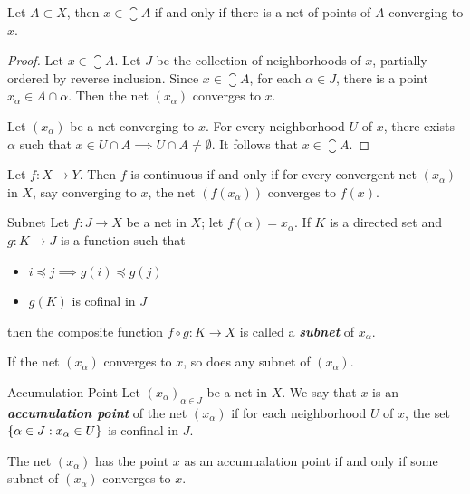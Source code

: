\documentclass[12pt,a4paper]{article}
\begin{document}
    \begin{thm}
        Let $A\subset X$, then $x\in\closure{A}$ if and only if there is a net of points of $A$ converging to $x$.
    \end{thm}
    \begin{proof}
        Let $x\in\closure{A}$. Let $J$ be the collection of neighborhoods of $x$, partially ordered by reverse inclusion. Since $x\in \closure{A}$, for each $\alpha\in J$, there is a point $x_\alpha\in A\cap \alpha$. Then the net $(x_\alpha)$ converges to $x$.

        Let $(x_\alpha)$ be a net converging to $x$. For every neighborhood $U$ of $x$, there exists $\alpha$ such that $x\in U\cap A\implies U\cap A\neq\emptyset$. It follows that $x\in\closure{A}$.
    \end{proof}
    \hfill

    \begin{thm}
        Let $f:X\to Y$. Then $f$ is continuous if and only if for every convergent net $(x_\alpha)$ in $X$, say converging to $x$, the net $(f(x_\alpha))$ converges to $f(x)$.
    \end{thm}
    \hfill

    \begin{defi}{Subnet}
        Let $f:J\to X$ be a net in $X$; let $f(\alpha)=x_\alpha$. If $K$ is a directed set and $g:K\to J$ is a function such that
        \begin{itemize}
            \item $i\preceq j\implies g(i)\preceq g(j)$
            \item $g(K)$ is cofinal in $J$
        \end{itemize}
        then the composite function $f\circ g:K\to X$ is called a \textbf{\textit{subnet}} of $x_\alpha$.
    \end{defi}
    \begin{thm}
        If the net $(x_\alpha)$ converges to $x$, so does any subnet of $(x_\alpha)$.
    \end{thm}
    \hfill

    \begin{defi}{Accumulation Point}
        Let $(x_\alpha)_{\alpha\in J}$ be a net in $X$. We say that $x$ is an \textbf{\textit{accumulation point}} of the net $(x_\alpha)$ if for each neighborhood $U$ of $x$, the set $\left\{\alpha\in J:x_\alpha\in U\right\}$ is confinal in $J$.
    \end{defi}
    \begin{lemma}\label{3.8.13}
        The net $(x_\alpha)$ has the point $x$ as an accumualation point if and only if some subnet of $(x_\alpha)$ converges to $x$.
    \end{lemma}
    \hfill
\end{document}
